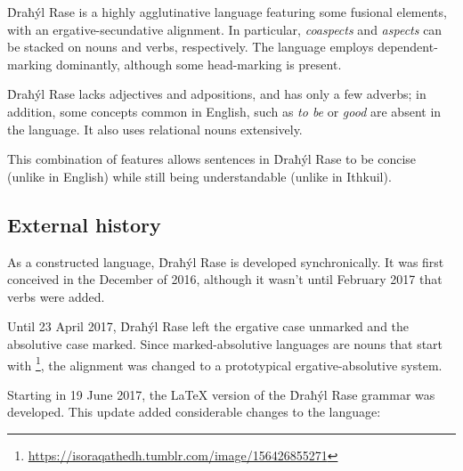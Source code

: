 \documentclass{book}
\begin{document}
Ḋraħýl Rase
is a highly agglutinative language featuring some fusional elements, with an ergative-secundative alignment. In particular, \emph{coaspects} and \emph{aspects} can be stacked on nouns and verbs, respectively. The language employs dependent-marking dominantly, although some head-marking is present.

Ḋraħýl Rase
lacks adjectives and adpositions, and has only a few adverbs; in addition, some concepts common in English, such as \emph{to be} or \emph{good} are absent in the language. It also uses relational nouns extensively.

This combination of features allows sentences in Ḋraħýl Rase
to be concise (unlike in English) while still being understandable (unlike in Ithkuil).

\subsection{External history}

As a constructed language, Ḋraħýl Rase
is developed synchronically. It was first conceived in the December of 2016, although it wasn't until February 2017 that verbs were added.

Until 23 April 2017, Ḋraħýl Rase
left the ergative case unmarked and the absolutive case marked. Since marked-absolutive languages are nouns that start with \footnote{\url{https://isoraqathedh.tumblr.com/image/156426855271}}, the alignment was changed to a prototypical ergative-absolutive system.

Starting in 19 June 2017, the \LaTeX{} version of the Ḋraħýl Rase
grammar was developed. This update added considerable changes to the language:
\end{document}
